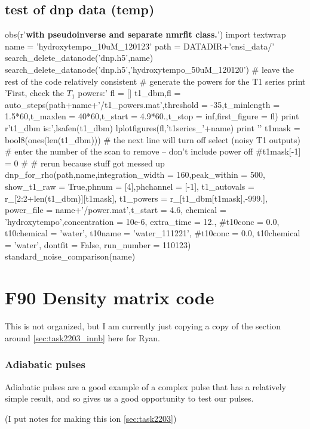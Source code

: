 \section{test of dnp data (temp)}
\begin{tiny}
\begin{python}[off]
obs(r'{\bf with pseudoinverse and separate nmrfit class.}')
import textwrap
name = 'hydroxytempo_10uM_120123'
path = DATADIR+'cnsi_data/'
search_delete_datanode('dnp.h5',name)
search_delete_datanode('dnp.h5','hydroxytempo_50uM_120120')
# leave the rest of the code relatively consistent
#{{{ generate the powers for the T1 series
print 'First, check the $T_1$ powers:\n\n'
fl = []
t1_dbm,fl = auto_steps(path+name+'/t1_powers.mat',threshold = -35,t_minlength = 1.5*60,t_maxlen = 40*60,t_start = 4.9*60.,t_stop = inf,first_figure = fl)
print r't1\_dbm is:',lsafen(t1_dbm)
lplotfigures(fl,'t1series_'+name)
print '\n\n'
t1mask = bool8(ones(len(t1_dbm)))
# the next line will turn off select (noisy T1 outputs)
# enter the number of the scan to remove -- don't include power off
#t1mask[-1] = 0
#}}}
# rerun because stuff got messed up
dnp_for_rho(path,name,integration_width = 160,peak_within = 500,
        show_t1_raw = True,phnum = [4],phchannel = [-1],
        t1_autovals = r_[2:2+len(t1_dbm)][t1mask],
        t1_powers = r_[t1_dbm[t1mask],-999.],
        power_file = name+'/power.mat',t_start = 4.6,
        chemical = 'hydroxytempo',concentration = 10e-6,
        extra_time = 12., #t10conc = 0.0, t10chemical = 'water',
        t10name = 'water_111221', #t10conc = 0.0, t10chemical = 'water',
        dontfit = False, run_number = 110123)
standard_noise_comparison(name)
\end{python}
\end{tiny}
\chapter{F90 Density matrix code}
This is not organized, but I am currently just copying a copy of the section around \ref{sec:task2203_innb} here for Ryan.
\subsection{Adiabatic pulses}
Adiabatic pulses are a good example of a complex pulse that has a relatively simple result, and so gives us a good opportunity to test our pulses.

\label{sec:task2203_innb}
(I put notes for making this ion \ref{sec:task2203})

